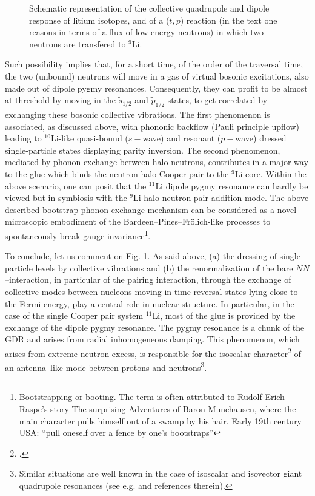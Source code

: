 \begin{subappendices}
\begin{figure}[h!]
\begin{center}
	\end{center}
	\caption{Schematic representation of the collective quadrupole and dipole response of litium isotopes, and of a ($t,p$) reaction (in the text one reasons in terms of a flux of low energy neutrons) in which two neutrons are transfered to $^9$Li.}
\label{fig8_A_1}
\end{figure}
Such possibility implies that, for a short time, of the order of the traversal time, the two (unbound) neutrons will move in a gas of virtual bosonic excitations, also made out of dipole pygmy resonances. Consequently, they can profit to be almost at threshold by moving in the $\tilde s_{1/2}$ and $\tilde p_{1/2}$ states, to get correlated by exchanging  these bosonic collective vibrations. 
The first phenomenon is associated, as discussed above, with phononic backflow (Pauli principle upflow) leading to $^{10}$Li-like quasi-bound ($s-$wave) and resonant ($p-$wave) dressed single-particle states displaying parity inversion.
The second phenomenon, mediated by phonon exchange between halo neutrons, contributes in a major way to the glue which binds the neutron halo Cooper pair to the $^{9}$Li core. Within the above scenario, one can posit that the $^{11}$Li dipole pygmy resonance can hardly be viewed but in symbiosis with the $^9$Li halo neutron pair addition mode. The above described bootstrap phonon-exchange mechanism can be considered as a novel microscopic embodiment of the Bardeen--Pines--Fr\"{o}lich-like processes to spontaneously break gauge invariance\footnote{Bootstrapping or booting. The term is often attributed to Rudolf Erich Raspe's story The surprising Adventures of Baron M\=unchausen, where the main character pulls himself out of a swamp by his hair. Early 19th century USA: ``pull oneself over a fence by one's bootstraps''}.


To conclude, let us comment on Fig. \ref{fig8_A_1}. As said above, (a) the dressing of single--particle levels by collective vibrations and (b) the renormalization of the bare $NN$--interaction, in particular of the pairing interaction, through the exchange of collective modes between nucleons moving in time reversal states lying close to the Fermi energy, play a central role in nuclear structure. In particular, in the case of the single Cooper pair system $^{11}$Li, most of the glue is provided by the exchange of the dipole pygmy resonance. The pygmy resonance is a chunk of the GDR  and arises from radial inhomogeneous damping. This phenomenon, which arises from extreme neutron excess, is responsible for the isoscalar character\footnote{\cite{Kanungo:15}.} of an antenna--like mode between protons and neutrons\footnote{Similar situations are well known in the case of isoscalar and isovector giant quadrupole resonances (see e.g. \cite{Bes:75c} and references therein).}.   






\end{subappendices}
